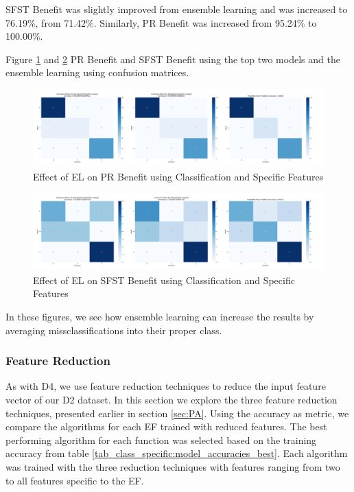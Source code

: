 \documentclass[12pt,letterpaper]{article}
\begin{document}
\ac{SFST} Benefit was slightly improved from ensemble learning and was increased to 76.19\%, from 71.42\%.
Similarly, \ac{PR} Benefit was increased from 95.24\% to 100.00\%.

Figure \ref{fig_class_specific:EL_PR} and \ref{fig_class_specific:EL_SFST_ben} \ac{PR} Benefit and \ac{SFST} Benefit using the top two models and the ensemble learning using confusion matrices.

\begin{figure}
    \centering
    \includegraphics[width=0.95\linewidth]{class_specific_section/top_2_and_ensemble_confusion_matrices_PR_Benefit.png}
    \caption{Effect of EL on PR Benefit using Classification and Specific Features}
    \label{fig_class_specific:EL_PR}
\end{figure}

\begin{figure}
    \centering
    \includegraphics[width=0.95\linewidth]{class_specific_section/top_2_and_ensemble_confusion_matrices_SFST_Benefit.png}
    \caption{Effect of EL on SFST Benefit using Classification and Specific Features}
    \label{fig_class_specific:EL_SFST_ben}
\end{figure}

In these figures, we see how ensemble learning can increase the results by averaging missclassifications into their proper class.



\subsubsection{Feature Reduction}\label{sec:class_specific_featred}
As with D4, we use feature reduction techniques to reduce the input feature vector of our D2 dataset.
In this section we explore the three feature reduction techniques, presented earlier in section \ref{sec:PA}.
Using the accuracy as metric, we compare the algorithms for each \ac{EF} trained with reduced features.
The best performing algorithm for each function was selected based on the training accuracy from table \ref{tab_class_specific:model_accuracies_best}.
Each algorithm was trained with the three reduction techniques with features ranging from two to all features specific to the \ac{EF}.
\end{document}
